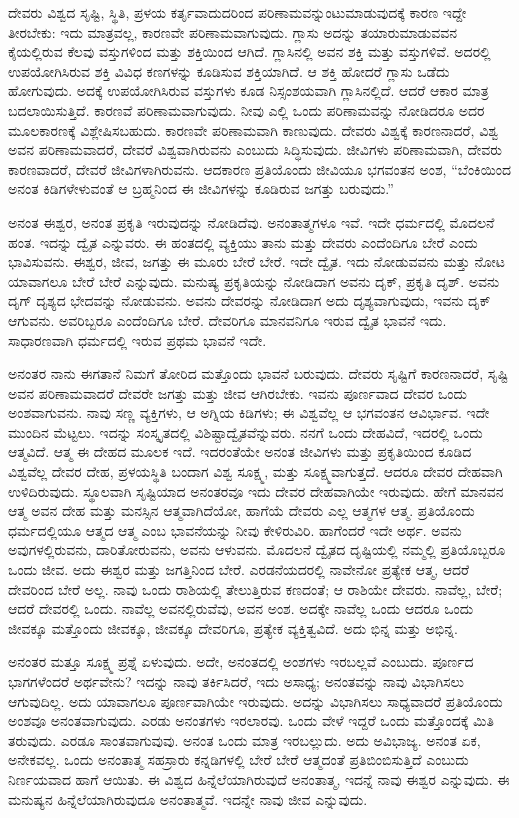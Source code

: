 ದೇವರು ವಿಶ್ವದ ಸೃಷ್ಟಿ, ಸ್ಥಿತಿ, ಪ್ರಳಯ ಕರ್ತೃವಾದುದರಿಂದ ಪರಿಣಾಮವನ್ನುಂಟುಮಾಡುವುದಕ್ಕೆ ಕಾರಣ ಇದ್ದೇ ತೀರಬೇಕು: ಇದು ಮಾತ್ರವಲ್ಲ, ಕಾರಣವೇ ಪರಿಣಾಮವಾಗುವುದು. ಗ್ಲಾಸು ಅದನ್ನು ತಯಾರುಮಾಡುವವನ ಕೈಯಲ್ಲಿರುವ ಕೆಲವು ವಸ್ತುಗಳಿಂದ ಮತ್ತು ಶಕ್ತಿಯಿಂದ ಆಗಿದೆ. ಗ್ಲಾಸಿನಲ್ಲಿ ಅವನ ಶಕ್ತಿ ಮತ್ತು ವಸ್ತುಗಳಿವೆ. ಅದರಲ್ಲಿ ಉಪಯೋಗಿಸಿರುವ ಶಕ್ತಿ ವಿವಿಧ ಕಣಗಳನ್ನು ಕೂಡಿಸುವ ಶಕ್ತಿಯಾಗಿದೆ. ಆ ಶಕ್ತಿ ಹೋದರೆ ಗ್ಲಾಸು ಒಡೆದು ಹೋಗುವುದು. ಅದಕ್ಕೆ ಉಪಯೋಗಿಸಿರುವ ವಸ್ತುಗಳು ಕೂಡ ನಿಸ್ಸಂಶಯವಾಗಿ ಗ್ಲಾಸಿನಲ್ಲಿದೆ. ಆದರೆ ಆಕಾರ ಮಾತ್ರ ಬದಲಾಯಿಸುತ್ತಿದೆ. ಕಾರಣವೆ ಪರಿಣಾಮವಾಗುವುದು. ನೀವು ಎಲ್ಲಿ ಒಂದು ಪರಿಣಾಮವನ್ನು ನೋಡಿದರೂ ಅದರ ಮೂಲಕಾರಣಕ್ಕೆ ವಿಶ್ಲೇಷಿಸಬಹುದು. ಕಾರಣವೇ ಪರಿಣಾಮವಾಗಿ ಕಾಣುವುದು. ದೇವರು ವಿಶ್ವಕ್ಕೆ ಕಾರಣನಾದರೆ, ವಿಶ್ವ ಅವನ ಪರಿಣಾಮವಾದರೆ, ದೇವರೆ ವಿಶ್ವವಾಗಿರುವನು ಎಂಬುದು ಸಿದ್ಧಿಸುವುದು. ಜೀವಿಗಳು ಪರಿಣಾಮವಾಗಿ, ದೇವರು ಕಾರಣವಾದರೆ, ದೇವರೆ ಜೀವಿಗಳಾಗಿರುವನು. ಆದಕಾರಣ ಪ್ರತಿಯೊಂದು ಜೀವಿಯೂ ಭಗವಂತನ ಅಂಶ, “ಬೆಂಕಿಯಿಂದ ಅನಂತ ಕಿಡಿಗಳೇಳುವಂತೆ ಆ ಬ್ರಹ್ಮನಿಂದ ಈ ಜೀವಿಗಳನ್ನು ಕೂಡಿರುವ ಜಗತ್ತು ಬರುವುದು.”

ಅನಂತ ಈಶ್ವರ, ಅನಂತ ಪ್ರಕೃತಿ ಇರುವುದನ್ನು ನೋಡಿದೆವು. ಅನಂತಾತ್ಮಗಳೂ ಇವೆ. ಇದೇ ಧರ್ಮದಲ್ಲಿ ಮೊದಲನೆ ಹಂತ. ಇದನ್ನು ದ್ವೈತ ಎನ್ನುವರು. ಈ ಹಂತದಲ್ಲಿ ವ್ಯಕ್ತಿಯು ತಾನು ಮತ್ತು ದೇವರು ಎಂದೆಂದಿಗೂ ಬೇರೆ ಎಂದು ಭಾವಿಸುವನು. ಈಶ್ವರ, ಜೀವ, ಜಗತ್ತು ಈ ಮೂರು ಬೇರೆ ಬೇರೆ. ಇದೇ ದ್ವೈತ. ಇದು ನೋಡುವವನು ಮತ್ತು ನೋಟ ಯಾವಾಗಲೂ ಬೇರೆ ಬೇರೆ ಎನ್ನುವುದು. ಮನುಷ್ಯ ಪ್ರಕೃತಿಯನ್ನು ನೋಡಿದಾಗ ಅವನು ದೃಕ್, ಪ್ರಕೃತಿ ದೃಶ್. ಅವನು ದೃಗ್ ದೃಶ್ಯದ ಭೇದವನ್ನು ನೋಡುವನು. ಅವನು ದೇವರನ್ನು ನೋಡಿದಾಗ ಅದು ದೃಶ್ಯವಾಗುವುದು, ಇವನು ದೃಕ್ ಆಗುವನು. ಅವರಿಬ್ಬರೂ ಎಂದೆಂದಿಗೂ ಬೇರೆ. ದೇವರಿಗೂ ಮಾನವನಿಗೂ ಇರುವ ದ್ವೈತ ಭಾವನೆ ಇದು. ಸಾಧಾರಣವಾಗಿ ಧರ್ಮದಲ್ಲಿ ಇರುವ ಪ್ರಥಮ ಭಾವನೆ ಇದೇ.

ಅನಂತರ ನಾನು ಈಗತಾನೆ ನಿಮಗೆ ತೋರಿದ ಮತ್ತೊಂದು ಭಾವನೆ ಬರುವುದು. ದೇವರು ಸೃಷ್ಟಿಗೆ ಕಾರಣನಾದರೆ, ಸೃಷ್ಟಿ ಅವನ ಪರಿಣಾಮವಾದರೆ ದೇವರೇ ಜಗತ್ತು ಮತ್ತು ಜೀವ ಆಗಿರಬೇಕು. ಇವನು ಪೂರ್ಣವಾದ ದೇವರ ಒಂದು ಅಂಶವಾಗುವನು. ನಾವು ಸಣ್ಣ ವ್ಯಕ್ತಿಗಳು, ಆ ಅಗ್ನಿಯ ಕಿಡಿಗಳು; ಈ ವಿಶ್ವವೆಲ್ಲ ಆ ಭಗವಂತನ ಆವಿರ್ಭಾವ. ಇದೇ ಮುಂದಿನ ಮೆಟ್ಟಲು. ಇದನ್ನು ಸಂಸ್ಕೃತದಲ್ಲಿ ವಿಶಿಷ್ಟಾದ್ವೈತವೆನ್ನುವರು. ನನಗೆ ಒಂದು ದೇಹವಿದೆ, ಇದರಲ್ಲಿ ಒಂದು ಆತ್ಮವಿದೆ. ಆತ್ಮ ಈ ದೇಹದ ಮೂಲಕ ಇದೆ. ಇದರಂತೆಯೇ ಅನಂತ ಜೀವಿಗಳು ಮತ್ತು ಪ್ರಕೃತಿಯಿಂದ ಕೂಡಿದ ವಿಶ್ವವೆಲ್ಲ ದೇವರ ದೇಹ, ಪ್ರಳಯಸ್ಥಿತಿ ಬಂದಾಗ ವಿಶ್ವ ಸೂಕ್ಷ್ಮ, ಮತ್ತು ಸೂಕ್ಷ್ಮವಾಗುತ್ತದೆ. ಆದರೂ ದೇವರ ದೇಹವಾಗಿ ಉಳಿದಿರುವುದು. ಸ್ಥೂಲವಾಗಿ ಸೃಷ್ಟಿಯಾದ ಅನಂತರವೂ ಇದು ದೇವರ ದೇಹವಾಗಿಯೇ ಇರುವುದು. ಹೇಗೆ ಮಾನವನ ಆತ್ಮ ಅವನ ದೇಹ ಮತ್ತು ಮನಸ್ಸಿನ ಆತ್ಮವಾಗಿದೆಯೋ, ಹಾಗೆಯೆ ದೇವರು ಎಲ್ಲ ಆತ್ಮಗಳ ಆತ್ಮ. ಪ್ರತಿಯೊಂದು ಧರ್ಮದಲ್ಲಿಯೂ ಆತ್ಮದ ಆತ್ಮ ಎಂಬ ಭಾವನೆಯನ್ನು ನೀವು ಕೇಳಿರುವಿರಿ. ಹಾಗೆಂದರೆ ಇದೇ ಅರ್ಥ. ಅವನು ಅವುಗಳಲ್ಲಿರುವನು, ದಾರಿತೋರುವನು, ಅವನು ಆಳುವನು. ಮೊದಲನೆ ದ್ವೈತದ ದೃಷ್ಟಿಯಲ್ಲಿ ನಮ್ಮಲ್ಲಿ ಪ್ರತಿಯೊಬ್ಬರೂ ಒಂದು ಜೀವ. ಅದು ಈಶ್ವರ ಮತ್ತು ಜಗತ್ತಿನಿಂದ ಬೇರೆ. ಎರಡನೆಯದರಲ್ಲಿ ನಾವೇನೋ ಪ್ರತ್ಯೇಕ ಆತ್ಮ, ಆದರೆ ದೇವರಿಂದ ಬೇರೆ ಅಲ್ಲ. ನಾವು ಒಂದು ರಾಶಿಯಲ್ಲಿ ತೇಲುತ್ತಿರುವ ಕಣದಂತೆ; ಆ ರಾಶಿಯೇ ದೇವರು. ನಾವೆಲ್ಲ, ಬೇರೆ; ಆದರೆ ದೇವರಲ್ಲಿ ಒಂದು. ನಾವೆಲ್ಲ ಅವನಲ್ಲಿರುವೆವು, ಅವನ ಅಂಶ. ಅದಕ್ಕೇ ನಾವೆಲ್ಲ ಒಂದು ಆದರೂ ಒಂದು ಜೀವಕ್ಕೂ ಮತ್ತೊಂದು ಜೀವಕ್ಕೂ, ಜೀವಕ್ಕೂ ದೇವರಿಗೂ, ಪ್ರತ್ಯೇಕ ವ್ಯಕ್ತಿತ್ವವಿದೆ. ಅದು ಭಿನ್ನ ಮತ್ತು ಅಭಿನ್ನ.

ಅನಂತರ ಮತ್ತೂ ಸೂಕ್ಷ್ಮ ಪ್ರಶ್ನೆ ಏಳುವುದು. ಅದೇ, ಅನಂತದಲ್ಲಿ ಅಂಶಗಳು ಇರಬಲ್ಲವೆ ಎಂಬುದು. ಪೂರ್ಣದ ಭಾಗಗಳೆಂದರೆ ಅರ್ಥವೇನು? ಇದನ್ನು ನಾವು ತರ್ಕಿಸಿದರೆ, ಇದು ಅಸಾಧ್ಯ; ಅನಂತವನ್ನು ನಾವು ವಿಭಾಗಿಸಲು ಆಗುವುದಿಲ್ಲ. ಅದು ಯಾವಾಗಲೂ ಪೂರ್ಣವಾಗಿಯೇ ಇರುವುದು. ಅದನ್ನು ವಿಭಾಗಿಸಲು ಸಾಧ್ಯವಾದರೆ ಪ್ರತಿಯೊಂದು ಅಂಶವೂ ಅನಂತವಾಗುವುದು. ಎರಡು ಅನಂತಗಳು ಇರಲಾರವು. ಒಂದು ವೇಳೆ ಇದ್ದರೆ ಒಂದು ಮತ್ತೊಂದಕ್ಕೆ ಮಿತಿ ತರುವುದು. ಎರಡೂ ಸಾಂತವಾಗುವುವು. ಅನಂತ ಒಂದು ಮಾತ್ರ ಇರಬಲ್ಲುದು. ಅದು ಅವಿಭಾಜ್ಯ. ಅನಂತ ಏಕ, ಅನೇಕವಲ್ಲ. ಒಂದು ಅನಂತಾತ್ಮ ಸಹಸ್ರಾರು ಕನ್ನಡಿಗಳಲ್ಲಿ ಬೇರೆ ಬೇರೆ ಆತ್ಮದಂತೆ ಪ್ರತಿಬಿಂಬಿಸುತ್ತಿದೆ ಎಂಬುದು ನಿರ್ಣಯವಾದ ಹಾಗೆ ಆಯಿತು. ಈ ವಿಶ್ವದ ಹಿನ್ನೆಲೆಯಾಗಿರುವುದೆ ಅನಂತಾತ್ಮ, ಇದನ್ನೆ ನಾವು ಈಶ್ವರ ಎನ್ನುವುದು. ಈ ಮನುಷ್ಯನ ಹಿನ್ನೆಲೆಯಾಗಿರುವುದೂ ಅನಂತಾತ್ಮವೆ. ಇದನ್ನೇ ನಾವು ಜೀವ ಎನ್ನುವುದು.

